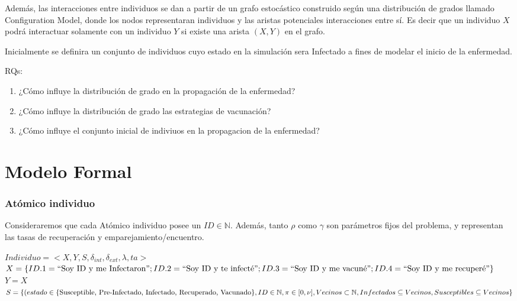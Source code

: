 \documentclass[10pt,a4paper]{article}
\begin{document}
Adem\'as, las interacciones entre individuos se dan a partir de un grafo estoc\'astico construido seg\'un una distribuci\'on de grados llamado Configuration Model, donde los nodos representaran individuos y las aristas potenciales interacciones entre s\'i. Es decir que un individuo $X$ podr\'a interactuar solamente con un individuo $Y$ si existe una arista $(X,Y)$ en el grafo.


Inicialmente se definira un conjunto de individuos cuyo estado en la simulaci\'on sera Infectado a fines de modelar el inicio de la enfermedad.


RQs:
\begin{enumerate}
\item ¿C\'omo influye la distribuci\'on de grado en la propagaci\'on de la enfermedad?
\item ¿C\'omo influye la distribuci\'on de grado las estrategias de vacunaci\'on?
\item ¿C\'omo influye el conjunto inicial de indiviuos en la propagacion de la enfermedad?
\end{enumerate}




\part*{Modelo Formal}
\section*{At\'omico individuo}


Consideraremos que cada At\'omico individuo posee un $ID \in \mathbb{N}$. Adem\'as, tanto $\rho$ como $\gamma$ son par\'ametros fijos del problema, y representan las tasas de recuperaci\'on y emparejamiento/encuentro.


$Individuo=<X,Y,S,\delta_{int},\delta_{ext},\lambda,ta>$\\


$X=\{ID.1=\text{``Soy ID y me Infectaron''};ID.2=\text{``Soy ID y te infect\'e''}; \\ ID.3= \text{``Soy ID y me vacun\'e''};ID.4=\text{``Soy ID y me recuper\'e''} \}$\\


$Y=X$\\


$S=\{(estado\in\{\text{Susceptible, Pre-Infectado, Infectado, Recuperado,} \\ \text{ Vacunado}\}, ID \in \mathbb{N}, \pi \in [0,\nu], Vecinos \subset \mathbb{N}, Infectados \subseteq Vecinos, \\ Susceptibles \subseteq Vecinos\}$\\
\end{document}
